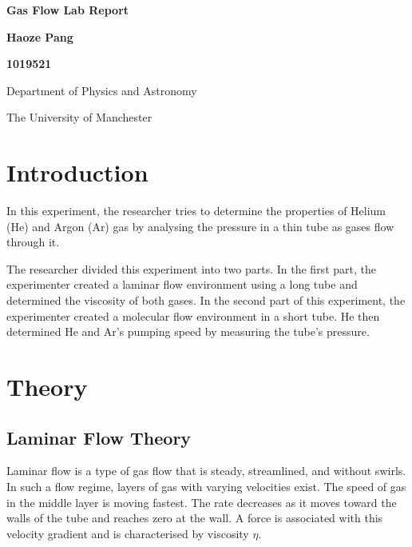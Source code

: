 \documentclass[12pt,a4paper]{article}
\begin{document}
{\pagestyle{empty}
\begin{center}
    \vspace*{0.5cm}
    
    \Huge
    \textbf{Gas Flow Lab Report}
    
    \vspace{0.5cm}
    
    \normalsize
    \textbf{Haoze Pang}
    
    \textbf{1019521}
    
    \vspace{0.5cm}
    
    Department of Physics and Astronomy
    
    The University of Manchester
\end{center}
\begin{abstract}
	\blindtext
\end{abstract}


\pagebreak[4]
}
	\section{Introduction}
	
	 In this experiment, the researcher tries to determine the properties of Helium (He) and Argon (Ar) gas by analysing the pressure in a thin tube as gases flow through it. 
	
	The researcher divided this experiment into two parts. In the first part, the experimenter created a laminar flow environment using a long tube and determined the viscosity of both gases. 
	In the second part of this experiment, the experimenter created a molecular flow environment in a short tube. He then determined He and Ar's pumping speed by measuring the tube's pressure.
	
	\section{Theory}
	\subsection{Laminar Flow Theory}
		Laminar flow is a type of gas flow that is steady, streamlined, and without swirls. In such a flow regime, layers of gas with varying velocities exist.  The speed of gas in the middle layer is moving fastest. The rate decreases as it moves toward the walls of the tube and reaches zero at the wall. A force is associated with this velocity gradient and is characterised by viscosity $\eta$. 
		
\end{document}
